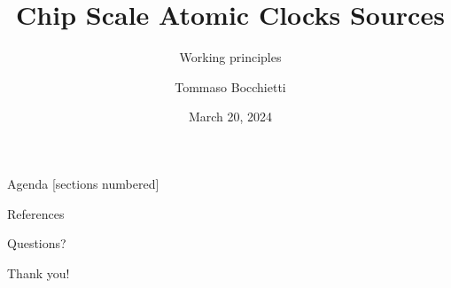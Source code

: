 \documentclass[10pt]{beamer}
\title{Chip Scale Atomic Clocks Sources}
\subtitle{Working principles}
\date{March 20, 2024}
\author{Tommaso Bocchietti}
\institute{University of Waterloo}
\begin{document}
\maketitle

\begin{frame}{Agenda}
    [sections numbered]
    \tableofcontents[hideallsubsections]
\end{frame}







\appendix



\begin{frame}[allowframebreaks]{References}
    \nocite{*}
    
\end{frame}

\begin{frame}[standout]
    Questions?
\end{frame}

\begin{frame}[standout]
    Thank you!
\end{frame}
\end{document}
